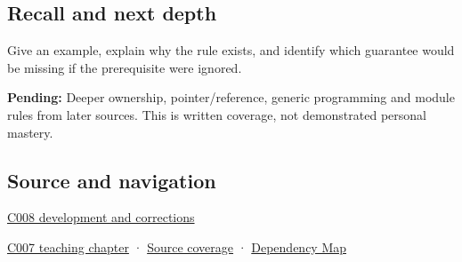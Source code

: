 \subsection{Recall and next depth}\label{appendix-f1581457d322-recall-and-next-depth}

Give an example, explain why the rule exists, and identify which guarantee would be missing if the prerequisite were ignored.

\textbf{Pending:} Deeper ownership, pointer/reference, generic programming and module rules from later sources. This is written coverage, not demonstrated personal mastery.

\subsection{Source and navigation}\label{appendix-f1581457d322-source-and-navigation}

\hyperref[appendix-fd090d982a15-m008---parts-113-126]{C008 development and corrections}

\hyperref[01-foundations-i-ch002-values-occupants-and-addresses-tell-different-stories]{C007 teaching chapter} · \hyperref[appendix-fd090d982a15-m007---parts-101-112]{Source coverage} · \hyperref[appendix-4ad47bdd269a]{Dependency Map}
